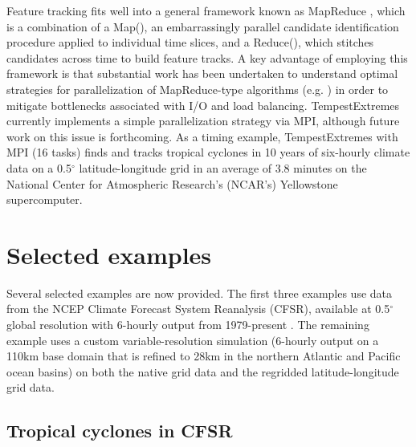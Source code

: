 \documentclass[gmdd, hvmath]{copernicus}
\begin{document}
Feature tracking fits well into a general framework known as MapReduce \citep{dean2008mapreduce}, which is a combination of a Map(), an embarrassingly parallel candidate identification procedure applied to individual time slices, and a Reduce(), which stitches candidates across time to build feature tracks.  A key advantage of employing this framework is that substantial work has been undertaken to understand optimal strategies for parallelization of MapReduce-type algorithms (e.g. \cite{Prabhat2012}) in order to mitigate bottlenecks associated with I/O and load balancing.  TempestExtremes currently implements a simple parallelization strategy via MPI, although future work on this issue is forthcoming. As a timing example, TempestExtremes with MPI (16 tasks) finds and tracks tropical cyclones in 10 years of six-hourly climate data on a 0.5$^\circ$ latitude-longitude grid in an average of 3.8 minutes on the National Center for Atmospheric Research's (NCAR's) Yellowstone supercomputer.

\section{Selected examples} \label{sec:SelectedExamples}

Several selected examples are now provided.  The first three examples use data from the NCEP Climate Forecast System Reanalysis (CFSR), available at 0.5$^\circ$ global resolution with 6-hourly output from 1979-present \citep{saha2010ncep}.  The remaining example uses a custom variable-resolution simulation \citep{zarzycki2014multidecadal} (6-hourly output on a 110km base domain that is refined to 28km in the northern Atlantic and Pacific ocean basins) on both the native grid data and the regridded latitude-longitude grid data.

\subsection{Tropical cyclones in CFSR} \label{sec:TropicalCycloneExample}
\end{document}
